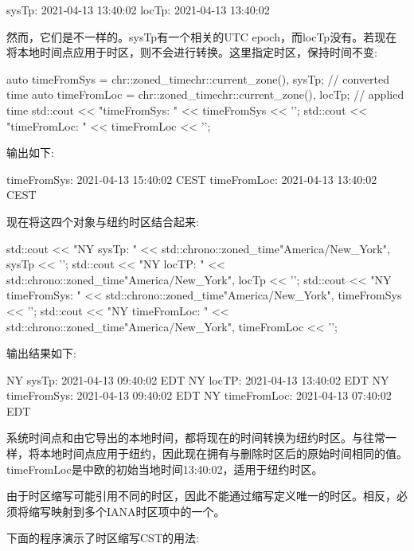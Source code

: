 \begin{shell}
sysTp:     2021-04-13 13:40:02
locTp:     2021-04-13 13:40:02
\end{shell}

然而，它们是不一样的。sysTp有一个相关的UTC epoch，而locTp没有。若现在将本地时间点应用于时区，则不会进行转换。这里指定时区，保持时间不变:

\begin{cpp}
auto timeFromSys = chr::zoned_time{chr::current_zone(), sysTp}; // converted time
auto timeFromLoc = chr::zoned_time{chr::current_zone(), locTp}; // applied time
std::cout << "timeFromSys: " << timeFromSys << '\n';
std::cout << "timeFromLoc: " << timeFromLoc << '\n';
\end{cpp}

输出如下:

\begin{shell}
timeFromSys: 2021-04-13 15:40:02 CEST
timeFromLoc: 2021-04-13 13:40:02 CEST
\end{shell}

现在将这四个对象与纽约时区结合起来:

\begin{cpp}
std::cout << "NY sysTp: "
		  << std::chrono::zoned_time{"America/New_York", sysTp} << '\n';
std::cout << "NY locTP: "
		  << std::chrono::zoned_time{"America/New_York", locTp} << '\n';
std::cout << "NY timeFromSys: "
		  << std::chrono::zoned_time{"America/New_York", timeFromSys} << '\n';
std::cout << "NY timeFromLoc: "
		  << std::chrono::zoned_time{"America/New_York", timeFromLoc} << '\n';
\end{cpp}

输出结果如下:

\begin{shell}
NY sysTp:       2021-04-13 09:40:02 EDT
NY locTP:       2021-04-13 13:40:02 EDT
NY timeFromSys: 2021-04-13 09:40:02 EDT
NY timeFromLoc: 2021-04-13 07:40:02 EDT
\end{shell}

系统时间点和由它导出的本地时间，都将现在的时间转换为纽约时区。与往常一样，将本地时间点应用于纽约，因此现在拥有与删除时区后的原始时间相同的值。timeFromLoc是中欧的初始当地时间13:40:02，适用于纽约时区。


由于时区缩写可能引用不同的时区，因此不能通过缩写定义唯一的时区。相反，必须将缩写映射到多个IANA时区项中的一个。

下面的程序演示了时区缩写CST的用法:


